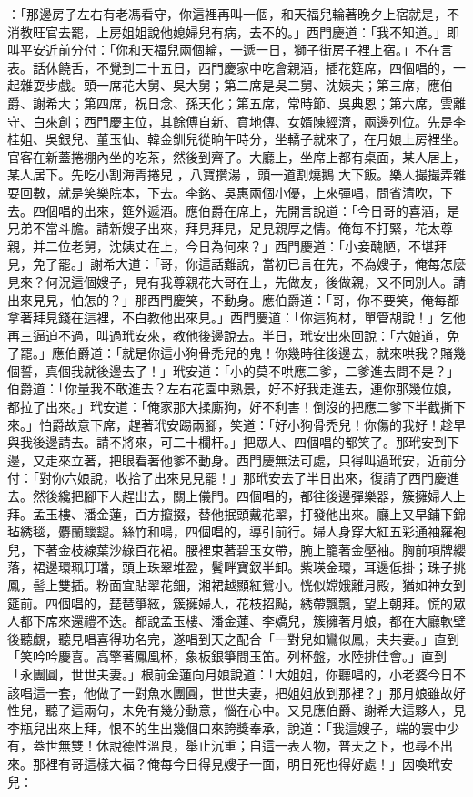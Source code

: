 \begin{showcontents}{}
：「那邊房子左右有老馮看守，你這裡再叫一個，和天福兒輪著晚夕上宿就是，不消教旺官去罷，上房姐姐說他媳婦兒有病，去不的。」西門慶道：「我不知道。」即叫平安近前分付：「你和天福兒兩個輪，一遞一日，獅子街房子裡上宿。」不在言表。話休饒舌，不覺到二十五日，西門慶家中吃會親酒，插花筵席，四個唱的，一起雜耍步戲。頭一席花大舅、吳大舅；第二席是吳二舅、沈姨夫；第三席，應伯爵、謝希大；第四席，祝日念、孫天化；第五席，常時節、吳典恩；第六席，雲離守、白來創；西門慶主位，其餘傅自新、賁地傳、女婿陳經濟，兩邊列位。先是李桂姐、吳銀兒、董玉仙、韓金釧兒從晌午時分，坐轎子就來了，在月娘上房裡坐。官客在新蓋捲棚內坐的吃茶，然後到齊了。大廳上，坐席上都有桌面，某人居上，某人居下。先吃小割海青捲兒 ，八寶攢湯 ，頭一道割燒鵝 大下飯。樂人撮撮弄雜耍回數，就是笑樂院本，下去。李銘、吳惠兩個小優，上來彈唱，問省清吹，下去。四個唱的出來，筵外遞酒。應伯爵在席上，先開言說道：「今日哥的喜酒，是兄弟不當斗膽。請新嫂子出來，拜見拜見，足見親厚之情。俺每不打緊，花太尊親，并二位老舅，沈姨丈在上，今日為何來？」西門慶道：「小妾醜陋，不堪拜見，免了罷。」謝希大道：「哥，你這話難說，當初已言在先，不為嫂子，俺每怎麼見來？何況這個嫂子，見有我尊親花大哥在上，先做友，後做親，又不同別人。請出來見見，怕怎的？」那西門慶笑，不動身。應伯爵道：「哥，你不要笑，俺每都拿著拜見錢在這裡，不白教他出來見。」西門慶道：「你這狗材，單管胡說！」乞他再三逼迫不過，叫過玳安來，教他後邊說去。半日，玳安出來回說：「六娘道，免了罷。」應伯爵道：「就是你這小狗骨禿兒的鬼！你幾時往後邊去，就來哄我？賭幾個誓，真個我就後邊去了！」玳安道：「小的莫不哄應二爹，二爹進去問不是？」伯爵道：「你量我不敢進去？左右花園中熟景，好不好我走進去，連你那幾位娘，都拉了出來。」玳安道：「俺家那大揉廝狗，好不利害！倒沒的把應二爹下半截撕下來。」怕爵故意下席，趕著玳安踢兩腳，笑道：「好小狗骨禿兒！你傷的我好！趁早與我後邊請去。請不將來，可二十欄杆。」把眾人、四個唱的都笑了。那玳安到下邊，又走來立著，把眼看著他爹不動身。西門慶無法可處，只得叫過玳安，近前分付：「對你六娘說，收拾了出來見見罷！」那玳安去了半日出來，復請了西門慶進去。然後纔把腳下人趕出去，關上儀門。四個唱的，都往後邊彈樂器，簇擁婦人上拜。孟玉樓、潘金蓮，百方攛掇，替他抿頭戴花翠，打發他出來。廳上又早鋪下錦毡綉毯，麝蘭靉靆。絲竹和鳴，四個唱的，導引前行。婦人身穿大紅五彩通袖羅袍兒，下著金枝線葉沙綠百花裙。腰裡束著碧玉女帶，腕上籠著金壓袖。胸前項牌纓落，裙邊環珮玎璫，頭上珠翠堆盈，鬢畔寶釵半卸。紫瑛金環，耳邊低掛；珠子挑鳳，髻上雙插。粉面宜貼翠花鈿，湘裙越顯紅鴛小。恍似嫦娥離月殿，猶如神女到筵前。四個唱的，琵琶箏絃，簇擁婦人，花枝招颭，綉帶飄飄，望上朝拜。慌的眾人都下席來還禮不迭。都說孟玉樓、潘金蓮、李嬌兒，簇擁著月娘，都在大廳軟壁後聽覷，聽見唱喜得功名完，遂唱到天之配合「一對兒如鸞似鳳，夫共妻。」直到「笑吟吟慶喜。高擎著鳳凰杯，象板銀箏間玉笛。列杯盤，水陸排佳會。」直到「永團圓，世世夫妻。」根前金蓮向月娘說道：「大姐姐，你聽唱的，小老婆今日不該唱這一套，他做了一對魚水團圓，世世夫妻，把姐姐放到那裡？」那月娘雖故好性兒，聽了這兩句，未免有幾分動意，惱在心中。又見應伯爵、謝希大這夥人，見李瓶兒出來上拜，恨不的生出幾個口來誇獎奉承，說道：「我這嫂子，端的寰中少有，蓋世無雙！休說德性溫良，舉止沉重；自這一表人物，普天之下，也尋不出來。那裡有哥這樣大福？俺每今日得見嫂子一面，明日死也得好處！」因喚玳安兒：
\end{showcontents}
